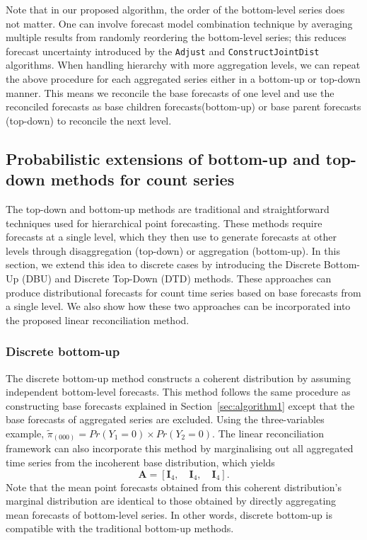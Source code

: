 \documentclass[a4paper,review,12pt,authoryear]{elsarticle}
\let\code=\texttt
\begin{document}
  Note that in our proposed algorithm, the order of the bottom-level series does not matter.
  One can involve forecast model combination technique by averaging multiple results from randomly reordering the bottom-level series; this reduces forecast uncertainty introduced by the \code{Adjust} and \code{ConstructJointDist} algorithms.
  When handling hierarchy with more aggregation levels, we can repeat the above procedure for each aggregated series either in a bottom-up or top-down manner. This means we reconcile the base forecasts of one level and use the reconciled forecasts as base children forecasts(bottom-up) or base parent forecasts (top-down) to reconcile the next level.



    \subsection{Probabilistic extensions of bottom-up and top-down methods for count series}

    The top-down and bottom-up methods are traditional and straightforward techniques used for hierarchical point forecasting.
    These methods require forecasts at a single level, which they then use to generate forecasts at other levels through disaggregation (top-down) or aggregation (bottom-up).
    In this section, we extend this idea to discrete cases by introducing the Discrete Bottom-Up (DBU) and Discrete Top-Down (DTD) methods. These approaches can produce distributional forecasts for count time series based on base forecasts from a single level.
    We also show how these two approaches can be incorporated into the proposed linear reconciliation method.

    \subsubsection*{\textbf{Discrete bottom-up}}
    \label{sec:bottomup}

    The discrete bottom-up method constructs a coherent distribution by assuming independent bottom-level forecasts.
    This method follows the same procedure as constructing base forecasts explained in Section~\ref{sec:algorithm1} except that the base forecasts of aggregated series are excluded.
    Using the three-variables example, $\tilde{\pi}_{(000)} = Pr(Y_1=0)\times Pr(Y_2=0)$.
    The linear reconciliation framework can also incorporate this method by marginalising out all aggregated time series from the incoherent base distribution, which yields \[
    \mathbf{A} = [\mathbf{I}_4, \quad \mathbf{I}_4, \quad \mathbf{I}_4 ].
    \]
    Note that the mean point forecasts obtained from this coherent distribution's marginal distribution are identical to those obtained by directly aggregating mean forecasts of bottom-level series.
    In other words, discrete bottom-up is compatible with the traditional bottom-up methods.
\end{document}
